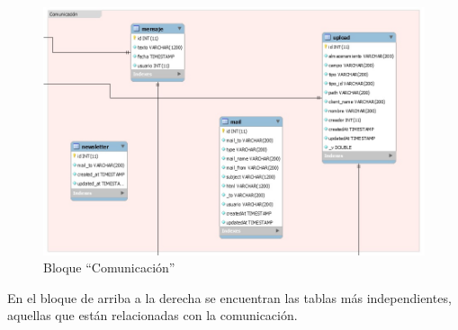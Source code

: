 \documentclass{article}
\begin{document}
\begin{figure}[p]
	\centering
	\includegraphics[scale=0.4]{comunicacion}
	\caption{Bloque ``Comunicación''}
	\label{fig:universe}
\end{figure}
En el bloque de arriba a la derecha se encuentran las tablas más independientes, aquellas que están relacionadas con la comunicación.
  
\end{document}
